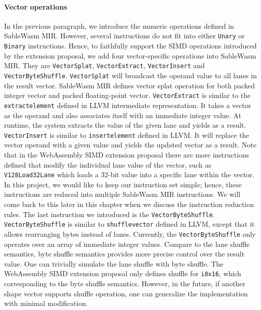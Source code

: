 \paragraph{Vector operations}
In the previous paragraph, we introduce the numeric operations defined in
SableWasm MIR. However, several instructions do not fit into either
\texttt{Unary} or \texttt{Binary} instructions. Hence, to faithfully support the
SIMD operations introduced by the extension proposal, we add four
vector-specific operations into SableWasm MIR. They are \texttt{VectorSplat},
\texttt{VectorExtract}, \texttt{VectorInsert} and \texttt{VectorByteShuffle}.
\texttt{VectorSplat} will broadcast the operand value to all lanes in the result
vector. SableWasm MIR defines vector splat operation for both packed integer
vector and packed floating-point vector. \texttt{VectorExtract} is similar to
the \texttt{extractelement} defined in LLVM intermediate representation. It
takes a vector as the operand and also associates itself with an immediate
integer value. At runtime, the system extracts the value of the given lane and
yields as a result. \texttt{VectorInsert} is similar to \texttt{insertelement}
defined in LLVM. It will replace the vector operand with a given value and
yields the updated vector as a result. Note that in the WebAssembly SIMD
extension proposal there are more instructions defined that modify the
individual lane value of the vector, such as \texttt{V128Load32Lane} which
loads a 32-bit value into a specific lane within the vector. In this project,
we would like to keep our instruction set simple; hence, these instructions are
reduced into multiple SableWasm MIR instructions. We will come back to this
later in this chapter when we discuss the instruction reduction rules. The last
instruction we introduced is the \texttt{VectorByteShuffle}.
\texttt{VectorByteShuffle} is similar to \texttt{shufflevector} defined in LLVM,
except that it allows rearranging bytes instead of lanes. Currently, the
\texttt{VectorByteShuffle} only operates over an array of immediate integer
values. Compare to the lane shuffle semantics, byte shuffle semantics provides
more precise control over the result value. One can trivially simulate the lane
shuffle with byte shuffle. The WebAssembly SIMD extension proposal only defines
shuffle for \texttt{i8x16}, which corresponding to the byte shuffle semantics.
However, in the future, if another shape vector supports shuffle operation, one
can generalize the implementation with minimal modification.

